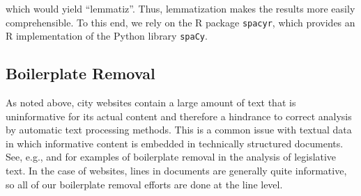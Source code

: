\documentclass[11pt]{article}
\begin{document}
which would yield ``lemmatiz''. Thus, lemmatization makes the results more easily comprehensible. To this end, we rely on the R package \texttt{spacyr}, which provides an R implementation of the Python library \texttt{spaCy}.

\subsection{Boilerplate Removal}\label{boilerplate}
As noted above, city websites contain a large amount of text that is uninformative for its actual content and therefore a hindrance to correct analysis by automatic text processing methods. This is a common issue with textual data in which informative content is embedded in technically structured documents. See, e.g., \citet{burgess2016legislative,wilkerson2015tracing} and \citet{linder2018text} for examples of boilerplate removal in the analysis of legislative text. In the case of websites, lines in documents are generally quite informative, so all of our boilerplate removal efforts are done at the line level.

\end{document}
